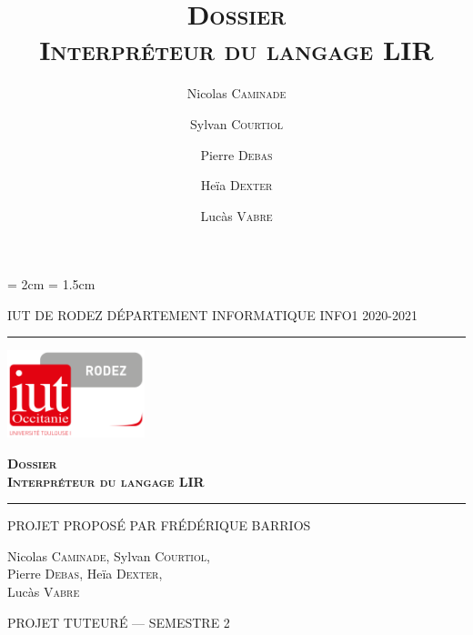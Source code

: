 \documentclass[12pt,a4paper,titlepage,oneside]{report}
\title{\textsc{\textbf{ Dossier
            \\Interpréteur du langage LIR}
}}
\date{}
\author{Nicolas \textsc{Caminade} \and Sylvan \textsc{Courtiol} \and Pierre
    \textsc{Debas} \and Heïa \textsc{Dexter} \and Lucàs \textsc{Vabre} }
\begin{document}
    \lhead{\leftmark}

    \cfoot{\thepage}
    \headheight = 2cm
    \headsep = 1.5cm

    \begin{titlepage}
        \selectfont

        \begin{center}\normalsize
            \MakeUppercase{IUT de Rodez \hfill Département informatique
                \hfill INFO1 2020-2021}
        \end{center}
        \vspace*{0.1cm}
        \hrule
        \vspace*{0.2cm}
        \begin{flushright}
            \includegraphics[width=4cm]{img/logoiut}
        \end{flushright}
        \vspace*{2cm}
        \begin{flushright}\Huge
            \textsc{\textbf{ Dossier
                    \\Interpréteur du langage LIR}}
        \end{flushright}
        \hrule
        \begin{flushleft}
            \MakeUppercase{Projet proposé par Frédérique Barrios}
        \end{flushleft}
        \vspace*{2cm}
        \begin{center}\Large
            Nicolas \textsc{Caminade}, Sylvan \textsc{Courtiol},\\
            Pierre \textsc{Debas}, Heïa \textsc{Dexter}, \\
            Lucàs \textsc{Vabre}
        \end{center}
        \vfill
        \begin{center}\normalsize
            \MakeUppercase{Projet tuteuré --- Semestre 2}
        \end{center}
    \end{titlepage}
\end{document}
